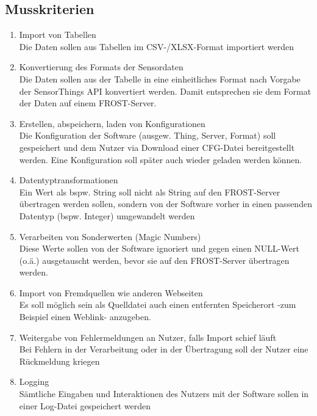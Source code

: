 \documentclass[12 pt]{article}
\begin{document}
\subsection{Musskriterien}
\begin{enumerate}
\item Import von Tabellen \\
	Die Daten sollen aus Tabellen im CSV-/XLSX-Format importiert werden
\item Konvertierung des Formats der Sensordaten \\
	Die Daten sollen aus der Tabelle in eine einheitliches Format nach Vorgabe der SensorThings API konvertiert werden. Damit entsprechen sie dem Format der Daten auf einem FROST-Server.
\item Erstellen, abspeichern, laden von Konfigurationen \\
	Die Konfiguration der Software (ausgew. Thing, Server, Format) soll gespeichert und dem Nutzer via Download einer CFG-Datei bereitgestellt werden. Eine Konfiguration soll später auch wieder geladen werden können.
\item Datentyptransformationen \\
	Ein Wert als bspw. String soll nicht als String auf den FROST-Server übertragen werden sollen, sondern von der Software vorher in einen passenden Datentyp (bspw. Integer) umgewandelt werden
\item Verarbeiten von Sonderwerten (Magic Numbers) \\
	Diese Werte sollen von der Software ignoriert und gegen einen NULL-Wert (o.ä.) ausgetauscht werden, bevor sie auf den FROST-Server übertragen werden.
\item Import von Fremdquellen wie anderen Webseiten \\
	Es soll möglich sein als Quelldatei auch einen entfernten Speicherort -zum Beispiel einen Weblink- anzugeben.
\item Weitergabe von Fehlermeldungen an Nutzer, falls Import schief läuft \\
	Bei Fehlern in der Verarbeitung oder in der Übertragung soll der Nutzer eine Rückmeldung kriegen
\item Logging \\
	Sämtliche Eingaben und Interaktionen des Nutzers mit der Software sollen in einer Log-Datei gespeichert werden
\end{enumerate}
\end{document}
